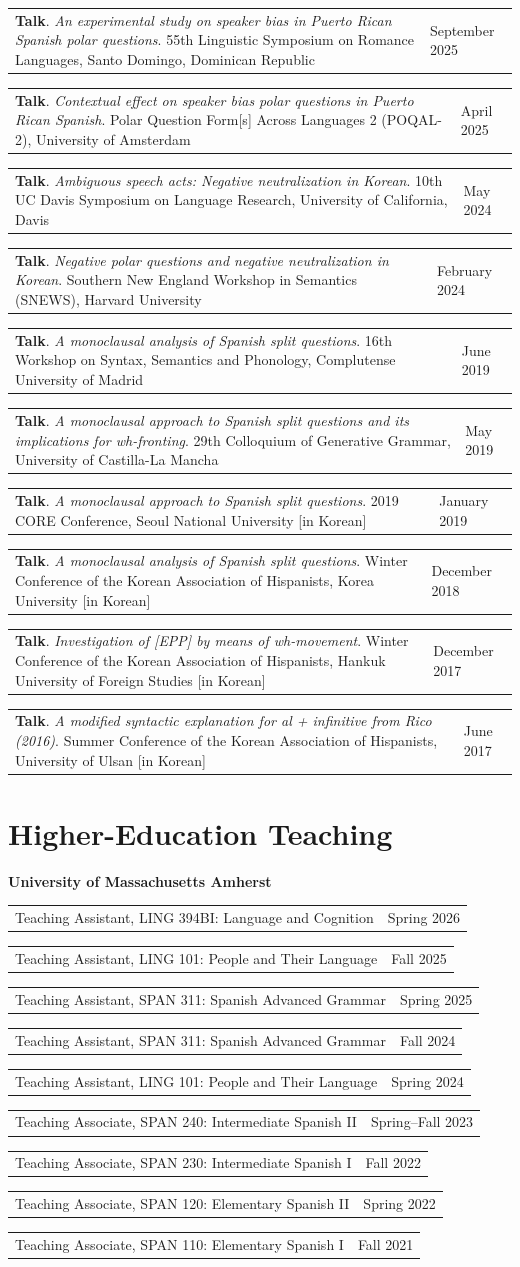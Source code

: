 \documentclass[10pt,letterpaper]{article}
\makeatletter
\newcommand{\datedentry}[2]{%
  \noindent\begin{tabularx}{\textwidth}{@{}X>{\raggedleft\arraybackslash}p{1.45in}@{}}
    #1 & \textcolor{muted}{#2}
  \end{tabularx}\par
}
\newcommand{\presentation}[4]{%
  \datedentry{\textbf{#1}. \textit{#2}. #3}{#4}\vspace{2pt}
}
\makeatother
\begin{document}
\presentation{Talk}{An experimental study on speaker bias in Puerto Rican Spanish polar questions}{55th Linguistic Symposium on Romance Languages, Santo Domingo, Dominican Republic}{September 2025}

\presentation{Talk}{Contextual effect on speaker bias polar questions in Puerto Rican Spanish}{Polar Question Form[s] Across Languages 2 (POQAL-2), University of Amsterdam}{April 2025}

\presentation{Talk}{Ambiguous speech acts: Negative neutralization in Korean}{10th UC Davis Symposium on Language Research, University of California, Davis}{May 2024}

\presentation{Talk}{Negative polar questions and negative neutralization in Korean}{Southern New England Workshop in Semantics (SNEWS), Harvard University}{February 2024}

\presentation{Talk}{A monoclausal analysis of Spanish split questions}{16th Workshop on Syntax, Semantics and Phonology, Complutense University of Madrid}{June 2019}

\presentation{Talk}{A monoclausal approach to Spanish split questions and its implications for wh-fronting}{29th Colloquium of Generative Grammar, University of Castilla-La Mancha}{May 2019}

\presentation{Talk}{A monoclausal approach to Spanish split questions}{2019 CORE Conference, Seoul National University [in Korean]}{January 2019}

\presentation{Talk}{A monoclausal analysis of Spanish split questions}{Winter Conference of the Korean Association of Hispanists, Korea University [in Korean]}{December 2018}

\presentation{Talk}{Investigation of [EPP] by means of wh-movement}{Winter Conference of the Korean Association of Hispanists, Hankuk University of Foreign Studies [in Korean]}{December 2017}

\presentation{Talk}{A modified syntactic explanation for \textit{al + infinitive} from Rico (2016)}{Summer Conference of the Korean Association of Hispanists, University of Ulsan [in Korean]}{June 2017}

\section{Higher-Education Teaching}

\textbf{University of Massachusetts Amherst}

\datedentry{Teaching Assistant, LING 394BI: Language and Cognition}{Spring 2026}
\datedentry{Teaching Assistant, LING 101: People and Their Language}{Fall 2025}
\datedentry{Teaching Assistant, SPAN 311: Spanish Advanced Grammar}{Spring 2025}
\datedentry{Teaching Assistant, SPAN 311: Spanish Advanced Grammar}{Fall 2024}
\datedentry{Teaching Assistant, LING 101: People and Their Language}{Spring 2024}
\datedentry{Teaching Associate, SPAN 240: Intermediate Spanish II}{Spring--Fall 2023}
\datedentry{Teaching Associate, SPAN 230: Intermediate Spanish I}{Fall 2022}
\datedentry{Teaching Associate, SPAN 120: Elementary Spanish II}{Spring 2022}
\datedentry{Teaching Associate, SPAN 110: Elementary Spanish I}{Fall 2021}
\end{document}

